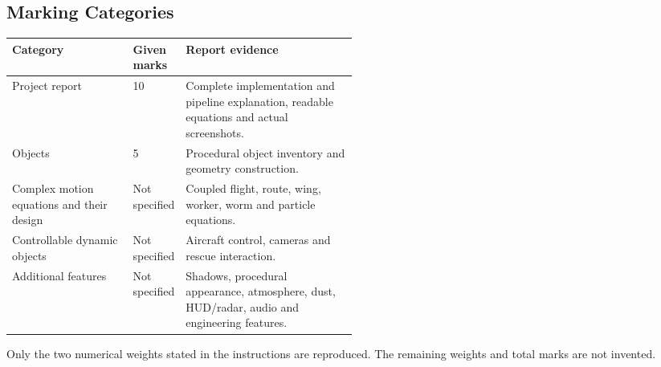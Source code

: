 \subsection{Marking Categories}
\begin{tabularx}{\linewidth}{L{0.35\linewidth}L{0.15\linewidth}Y}
\toprule\textbf{Category}&\textbf{Given marks}&\textbf{Report evidence}\\\midrule
Project report & 10 & Complete implementation and pipeline explanation, readable equations and actual screenshots.\\
Objects & 5 & Procedural object inventory and geometry construction.\\
Complex motion equations and their design & Not specified & Coupled flight, route, wing, worker, worm and particle equations.\\
Controllable dynamic objects & Not specified & Aircraft control, cameras and rescue interaction.\\
Additional features & Not specified & Shadows, procedural appearance, atmosphere, dust, HUD/radar, audio and engineering features.\\
\bottomrule
\end{tabularx}
Only the two numerical weights stated in the instructions are reproduced. The remaining weights and total marks are not invented.

